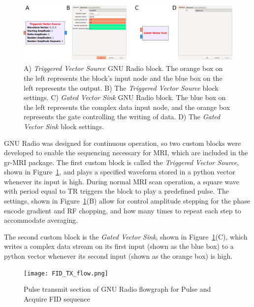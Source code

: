 \documentclass[review]{elsarticle}
\renewcommand{\textcolor}[1]{}
\begin{document}
\begin{figure}[!ht]
\begin{center}
\includegraphics[width = \textwidth,trim=0 0 0 0,clip=false]{triggered_vector_source.png}
\caption{\textcolor{black}{A) \textit{Triggered Vector Source} GNU Radio block.  The orange box on the left represents the block's input node and the blue box on the left represents the output. B) The \textit{Triggered Vector Source} block settings.  C) \textit{Gated Vector Sink} GNU Radio block.  The blue box on the left represents the complex data input node, and the orange box represents the gate controlling the writing of data. D) The \textit{Gated Vector Sink} block settings.}}
\label{fig:tvs}
\end{center}
\end{figure}

GNU Radio was designed for continuous operation, so two custom blocks were developed to enable the sequencing necessary for MRI, which are included in the gr-MRI package.  The first custom block is called the \textit{Triggered Vector Source}, shown in Figure~\ref{fig:tvs}, and plays a specified waveform stored in a python vector whenever its input is high.  During normal MRI scan operation, a square wave with period equal to TR triggers the block to play a predefined pulse.  The settings, shown in Figure~\ref{fig:tvs}(B) allow for control amplitude stepping for the phase encode gradient and RF chopping, and how many times to repeat each step to accommodate averaging.

The second custom block is the \textit{Gated Vector Sink}, shown in Figure~\ref{fig:tvs}(C), which writes a complex data stream on its first input (shown as the blue box) to a python vector whenever its second input (shown as the orange box) is high.

\begin{figure}[ht]
\begin{center}
\texttt{[image: FID\_TX\_flow.png]}
\caption{\textcolor{black}{Pulse transmit section of GNU Radio flowgraph for Pulse and Acquire FID sequence}}
\label{fig:txflow}
\end{center}
\end{figure}
\end{document}
